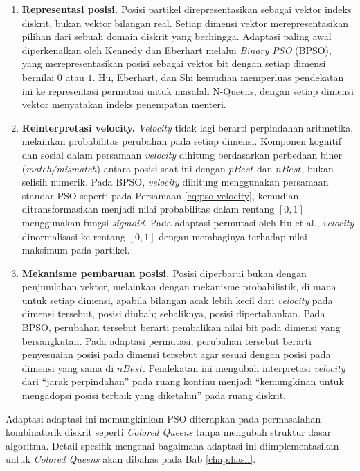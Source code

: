 \begin{enumerate}
	\item \textbf{Representasi posisi.} Posisi partikel direpresentasikan sebagai vektor indeks diskrit, bukan vektor bilangan real. Setiap dimensi vektor merepresentasikan pilihan dari sebuah domain diskrit yang berhingga. Adaptasi paling awal diperkenalkan oleh Kennedy dan Eberhart \cite{kennedy1997discrete} melalui \textit{Binary PSO} (BPSO), yang merepresentasikan posisi sebagai vektor bit dengan setiap dimensi bernilai $0$ atau $1$. Hu, Eberhart, dan Shi \cite{hu2003swarm} kemudian memperluas pendekatan ini ke representasi permutasi untuk masalah N-Queens, dengan setiap dimensi vektor menyatakan indeks penempatan menteri.
	
	\item \textbf{Reinterpretasi velocity.} \textit{Velocity} tidak lagi berarti perpindahan aritmetika, melainkan probabilitas perubahan pada setiap dimensi. Komponen kognitif dan sosial dalam persamaan \textit{velocity} dihitung berdasarkan perbedaan biner (\textit{match/mismatch}) antara posisi saat ini dengan $pBest$ dan $nBest$, bukan selisih numerik. Pada BPSO, \textit{velocity} dihitung menggunakan persamaan standar PSO seperti pada Persamaan \ref{eq:pso-velocity}, kemudian ditransformasikan menjadi nilai probabilitas dalam rentang $[0, 1]$ menggunakan fungsi \textit{sigmoid}. Pada adaptasi permutasi oleh Hu et al., \textit{velocity} dinormalisasi ke rentang $[0, 1]$ dengan membaginya terhadap nilai maksimum pada partikel.
	
	\item \textbf{Mekanisme pembaruan posisi.} Posisi diperbarui bukan dengan penjumlahan vektor, melainkan dengan mekanisme probabilistik, di mana untuk setiap dimensi, apabila bilangan acak lebih kecil dari \textit{velocity} pada dimensi tersebut, posisi diubah; sebaliknya, posisi dipertahankan. Pada BPSO, perubahan tersebut berarti pembalikan nilai bit pada dimensi yang bersangkutan. Pada adaptasi permutasi, perubahan tersebut berarti penyesuaian posisi pada dimensi tersebut agar sesuai dengan posisi pada dimensi yang sama di $nBest$. Pendekatan ini mengubah interpretasi \textit{velocity} dari ``jarak perpindahan'' pada ruang kontinu menjadi ``kemungkinan untuk mengadopsi posisi terbaik yang diketahui'' pada ruang diskrit.
\end{enumerate}

Adaptasi-adaptasi ini memungkinkan PSO diterapkan pada permasalahan kombinatorik diskrit seperti \textit{Colored Queens} tanpa mengubah struktur dasar algoritma. Detail spesifik mengenai bagaimana adaptasi ini diimplementasikan untuk \textit{Colored Queens} akan dibahas pada Bab \ref{chap:hasil}.

